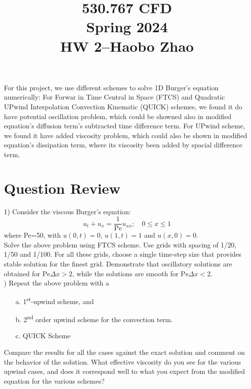\documentclass[12pt]{article}
\begin{document}
\title{530.767 CFD\\Spring 2024\\HW 2–Haobo Zhao}
\maketitle

For this project, we use different schemes to solve
1D Burger's equation numerically: For Forwar in Time Central
in Space (FTCS) and Quadratic UPwind Interpolation Convection
Kinematic (QUICK) schemes, we found it do have potential 
oscillation problem, which could be showned also in modified 
equation's diffusion term's subtracted time difference term. 
For UPwind scheme, we found it have added viscosity problem,
which could also be shown in modified equation's dissipation
term, where its viscosity been added by spacial difference term.

\tableofcontents


\section{Question Review}

1) Consider the viscous Burger's equation:
\begin{equation}
    u_t + u_x = \frac{1}{\text{Pe}} u_{xx} ; \quad 0 
    \leq x \leq 1
\end{equation}
where Pe=50, with \( u(0,t) = 0 \), \( u(1,t) = 1 \) and 
\( u(x,0) = 0 \).\\

Solve the above problem using FTCS scheme. Use grids with 
spacing of 1/20, 1/50 and 1/100. For all these grids, choose 
a single time-step size that provides stable solution for the 
finest grid. Demonstrate that oscillatory solutions are 
obtained for \( \text{Pe}\Delta x > 2 \), while the solutions 
are smooth for \( \text{Pe}\Delta x < 2 \).\\




) Repeat the above problem with a
\begin{enumerate}
    \item[a.] 1\textsuperscript{st}-upwind scheme, and
    \item[b.] 2\textsuperscript{nd} order upwind scheme for the convection term.
    \item[c.] QUICK Scheme
\end{enumerate}
Compare the results for all the cases against the exact 
solution and comment on the behavior of the solution.
What effective viscosity do you see for the various upwind 
cases, and does it correspond well to what you expect from 
the modified equation for the various schemes?
\end{document}
